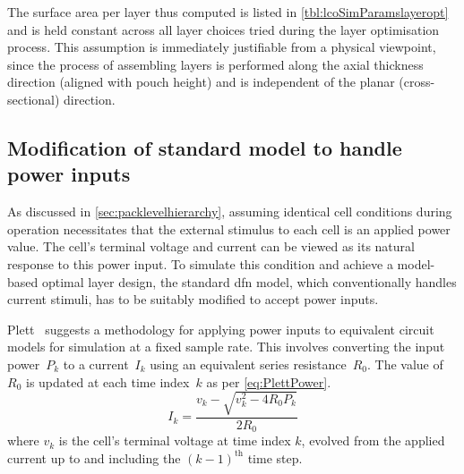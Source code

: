 \begin{enumerate}[ label=\textbf{\arabic*}), leftmargin=0pt, itemindent=20pt, labelwidth=15pt, labelsep=5pt, listparindent=0.7cm, align=left]
        The   surface   area   per   layer    thus   computed   is   listed   in
        \cref{tbl:lcoSimParamslayeropt} and  is held  constant across  all layer
        choices  tried during  the layer  optimisation process.  This assumption
        is  immediately  justifiable  from   a  physical  viewpoint,  since  the
        process  of assembling  layers is  performed along  the axial  thickness
        direction (aligned with  pouch height) and is independent  of the planar
        (cross-sectional) direction.

\end{enumerate}

\subsection{Modification of standard  model to handle power inputs}\label{sec:innatepowerinput}

As   discussed  in   \cref{sec:packlevelhierarchy},   assuming  identical   cell
conditions during operation necessitates that the external stimulus to each cell
is an applied power value. The cell's terminal voltage and current can be viewed
as its  natural response  to this  power input. To  simulate this  condition and
achieve a model-based optimal layer  design, the standard \gls{dfn} model, which
conventionally handles  current stimuli, has  to be suitably modified  to accept
power inputs.

Plett~\cite{Plett2016}  suggests  a methodology  for  applying  power inputs  to
equivalent circuit models  for simulation at a fixed sample  rate. This involves
converting the input  power~$P_k$ to a current~$I_k$ using  an equivalent series
resistance~$R_0$. The  value of $R_0$ is  updated at each time  index~$k$ as per
\cref{eq:PlettPower}.
\begin{equation}\label{eq:PlettPower}
    I_k = \frac{v_k - \sqrt{v^\text{2}_k - 4R_0P_{k}}}{2R_0}
\end{equation}
where $v_k$ is the  cell's terminal voltage at time index  $k$, evolved from the
applied current up to and including the $(k-1)^\text{th}$ time step.

